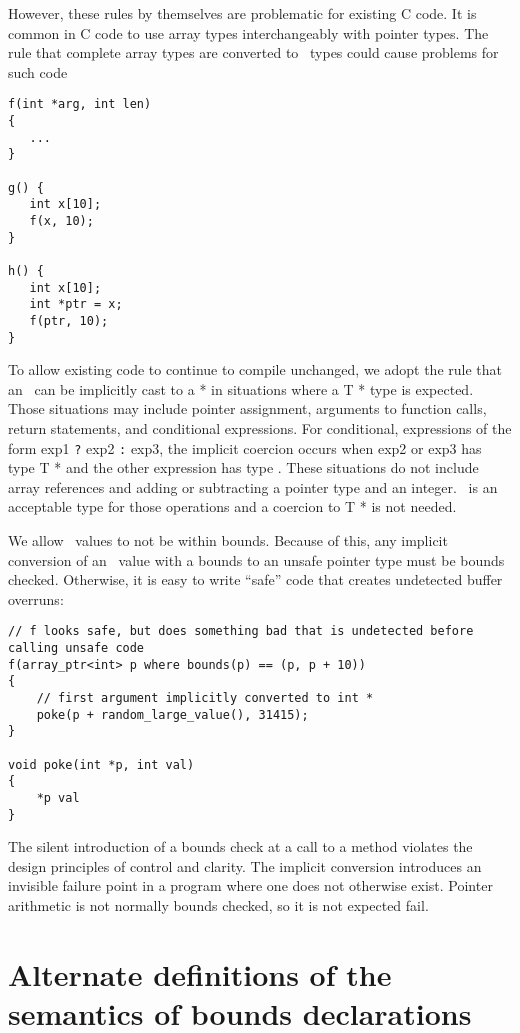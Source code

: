 However, these rules by themselves are problematic for existing C code.
It is common in C code to use array types interchangeably with pointer
types. The rule that complete array types are converted to
\arrayptr\ types could cause problems for such code

\begin{verbatim}
f(int *arg, int len)
{ 
   ...
}

g() {
   int x[10];
   f(x, 10);
}

h() {
   int x[10];
   int *ptr = x;
   f(ptr, 10);
}
\end{verbatim}

To allow existing code to continue to compile unchanged, we adopt the
rule that an \arrayptrT\ can be
implicitly cast to a  * in situations where a T * type is
expected. Those situations may include pointer assignment, arguments to
function calls, return statements, and conditional expressions. For
conditional, expressions of the form exp1 \texttt{?} exp2 \texttt{:}
exp3, the implicit coercion occurs when exp2 or exp3 has type T * and
the other expression has type
\arrayptrT. These situations do not
include array references and adding or subtracting a pointer type and an
integer. \arrayptrT\ is an acceptable
type for those operations and a coercion to T * is not needed.

We allow \arrayptr\ values to not be within bounds. Because of
this, any implicit conversion of an \arrayptr\ value with a
bounds to an unsafe pointer type must be bounds checked. Otherwise, it
is easy to write ``safe'' code that creates undetected buffer overruns:

\begin{verbatim}
// f looks safe, but does something bad that is undetected before calling unsafe code
f(array_ptr<int> p where bounds(p) == (p, p + 10))
{
    // first argument implicitly converted to int *
    poke(p + random_large_value(), 31415);  
}

void poke(int *p, int val)
{
    *p val
}
\end{verbatim}

The silent introduction of a bounds check at a call to a method violates
the design principles of control and clarity. The implicit conversion
introduces an invisible failure point in a program where one does not
otherwise exist. Pointer arithmetic is not normally bounds checked, so
it is not expected fail.

\section{Alternate definitions of the semantics of bounds declarations}\label{alternate-definitions-of-the-semantics-of-bounds-declarations}

